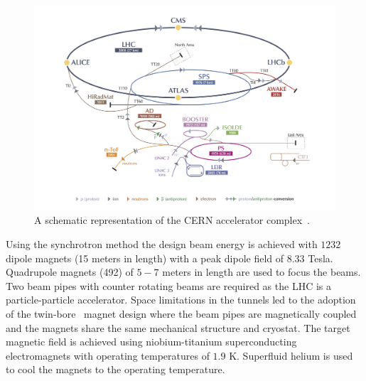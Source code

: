 \begin{figure}[h]
\centering
\includegraphics[width=1.0\columnwidth]{figures_chapter2/cern_complex.jpg}
\caption{A schematic representation of the CERN accelerator complex~\cite{Haffner:1621894}.}
\label{fig:cern}
\end{figure}

Using the synchrotron method the design beam energy is achieved with $1232$ dipole magnets (15 meters in length) with a peak dipole field of $8.33$ Tesla. Quadrupole magnets (492) of $5-7$ meters in length are used to focus the beams. Two beam pipes with counter rotating beams are required as the LHC is a particle-particle accelerator.  Space limitations in the tunnels led to the adoption of the twin-bore~\cite{Blewett:1971zzb} magnet design where the beam pipes are magnetically coupled and the magnets share the same mechanical structure and cryostat. The target magnetic field is achieved using niobium-titanium superconducting electromagnets with operating temperatures of $1.9$ K. Superfluid helium is used to cool the magnets to the operating temperature.
   
